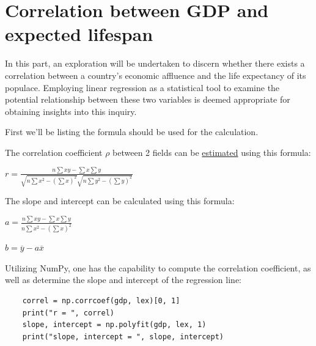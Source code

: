 %
\chapter{Correlation between GDP and expected lifespan}
\label{part3}
In this part, an exploration will be undertaken to discern whether there exists a correlation between a country's economic affluence and the life expectancy of its populace. Employing linear regression as a statistical tool to examine the potential relationship between these two variables is deemed appropriate for obtaining insights into this inquiry.

First we'll be listing the formula should be used for the calculation.

The correlation coefficient $\rho$ between 2 fields can be \underline{estimated} using this formula:
\begin{center}
  {\fontsize{20}{20}\selectfont
    \( r = \frac{n \sum{xy} - \sum{x} \sum{y}}{\sqrt{n \sum{x^2} - ({\sum{x}})^2} \sqrt{n \sum{y^2}- ({\sum{y}})^2}} \)
  }
\end{center}

The slope and intercept can be calculated using this formula:
\begin{center}
{\fontsize{16}{20}\selectfont
    \( a = \frac{n \sum{xy} - \sum{x} \sum{y}}{n \sum{x^2} - ({\sum{x}})^2}\)
  }
\end{center}
\begin{center}
    {\fontsize{16}{20}\selectfont
    \( b = \overline{y} - a\overline{x}\)
  }
\end{center}
Utilizing NumPy, one has the capability to compute the correlation coefficient, as well as determine the slope and intercept of the regression line:
\begin{verbatim}
    correl = np.corrcoef(gdp, lex)[0, 1]
    print("r = ", correl)
    slope, intercept = np.polyfit(gdp, lex, 1)
    print("slope, intercept = ", slope, intercept)
\end{verbatim}


